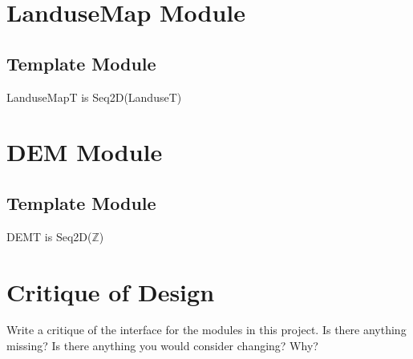 \documentclass[12pt]{article}
\begin{document}
\section* {LanduseMap Module}

\subsection* {Template Module}

LanduseMapT is Seq2D(LanduseT)

\section* {DEM Module}

\subsection* {Template Module}

DEMT is Seq2D($\mathbb{Z}$)

\newpage

\section{Critique of Design}

Write a critique of the interface for the modules in this project.  Is there
anything missing?  Is there anything you would consider changing?  Why?
\end{document}
